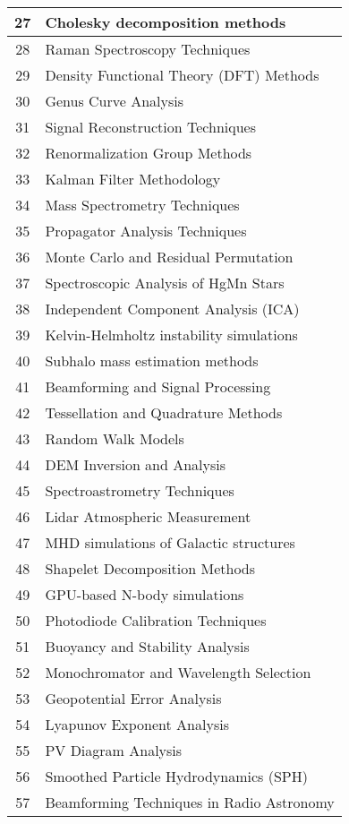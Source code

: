 \begin{table}[htbp]
\begin{tabular}{|c|l|}
27 & Cholesky decomposition methods \\
\hline
28 & Raman Spectroscopy Techniques \\
\hline
29 & Density Functional Theory (DFT) Methods \\
\hline
30 & Genus Curve Analysis \\
\hline
31 & Signal Reconstruction Techniques \\
\hline
32 & Renormalization Group Methods \\
\hline
33 & Kalman Filter Methodology \\
\hline
34 & Mass Spectrometry Techniques \\
\hline
35 & Propagator Analysis Techniques \\
\hline
36 & Monte Carlo and Residual Permutation \\
\hline
37 & Spectroscopic Analysis of HgMn Stars \\
\hline
38 & Independent Component Analysis (ICA) \\
\hline
39 & Kelvin-Helmholtz instability simulations \\
\hline
40 & Subhalo mass estimation methods \\
\hline
41 & Beamforming and Signal Processing \\
\hline
42 & Tessellation and Quadrature Methods \\
\hline
43 & Random Walk Models \\
\hline
44 & DEM Inversion and Analysis \\
\hline
45 & Spectroastrometry Techniques \\
\hline
46 & Lidar Atmospheric Measurement \\
\hline
47 & MHD simulations of Galactic structures \\
\hline
48 & Shapelet Decomposition Methods \\
\hline
49 & GPU-based N-body simulations \\
\hline
50 & Photodiode Calibration Techniques \\
\hline
51 & Buoyancy and Stability Analysis \\
\hline
52 & Monochromator and Wavelength Selection \\
\hline
53 & Geopotential Error Analysis \\
\hline
54 & Lyapunov Exponent Analysis \\
\hline
55 & PV Diagram Analysis \\
\hline
56 & Smoothed Particle Hydrodynamics (SPH) \\
\hline
57 & Beamforming Techniques in Radio Astronomy \\

\end{tabular}
\end{table}
